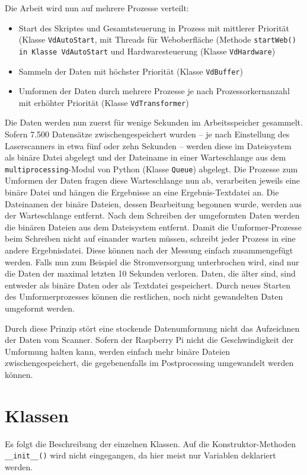 \documentclass[a4paper,12pt,bibliography=totoc, listof=totoc,titlepage]{scrreprt}
\newcommand{\code}[1]{\texttt{#1}}
\begin{document}
Die Arbeit wird nun auf mehrere Prozesse verteilt:
\begin{itemize}
 \item Start des Skriptes und Gesamtsteuerung in Prozess mit mittlerer Priorität (Klasse \code{VdAutoStart}, mit Threads für Weboberfläche (Methode \code{startWeb() in Klasse \code{VdAutoStart}} und Hardwaresteuerung (Klasse \code{VdHardware})
 \item Sammeln der Daten mit höchster Priorität (Klasse \code{VdBuffer})
 \item Umformen der Daten durch mehrere Prozesse je nach Prozessorkernanzahl mit erhöhter Priorität (Klasse \code{VdTransformer})
\end{itemize}

Die Daten werden nun zuerst für wenige Sekunden im Arbeitsspeicher gesammelt. Sofern 7.500 Datensätze zwischengespeichert wurden -- je nach Einstellung des Laserscanners in etwa fünf oder zehn Sekunden -- werden diese im Dateisystem als binäre Datei abgelegt und der Dateiname in einer Warteschlange aus dem \code{multiprocessing}-Modul von Python (Klasse \code{Queue}) abgelegt. Die Prozesse zum Umformen der Daten fragen diese Warteschlange nun ab, verarbeiten jeweils eine binäre Datei und hängen die Ergebnisse an eine Ergebnis-Textdatei an. Die Dateinamen der binäre Dateien, dessen Bearbeitung begonnen wurde, werden aus der Warteschlange entfernt. Nach dem Schreiben der umgeformten Daten werden die binären Dateien aus dem Dateisystem entfernt. Damit die Umformer-Prozesse beim Schreiben nicht auf einander warten müssen, schreibt jeder Prozess in eine andere Ergebnisdatei. Diese können nach der Messung einfach zusammengefügt werden. Falls nun zum Beispiel die Stromversorgung unterbrochen wird, sind nur die Daten der maximal letzten 10 Sekunden verloren. Daten, die älter sind, sind entweder als binäre Daten oder als Textdatei gespeichert. Durch neues Starten des Umformerprozesses können die restlichen, noch nicht gewandelten Daten umgeformt werden.

Durch diese Prinzip stört eine stockende Datenumformung nicht das Aufzeichnen der Daten vom Scanner. Sofern der Raspberry Pi nicht die Geschwindigkeit der Umformung halten kann, werden einfach mehr binäre Dateien zwischengespeichert, die gegebenenfalls im Postprocessing umgewandelt werden können.

\section{Klassen}
Es folgt die Beschreibung der einzelnen Klassen. Auf die Konstruktor-Methoden \code{\_\_init\_\_()} wird nicht eingegangen, da hier meist nur Variablen deklariert werden.
\end{document}
